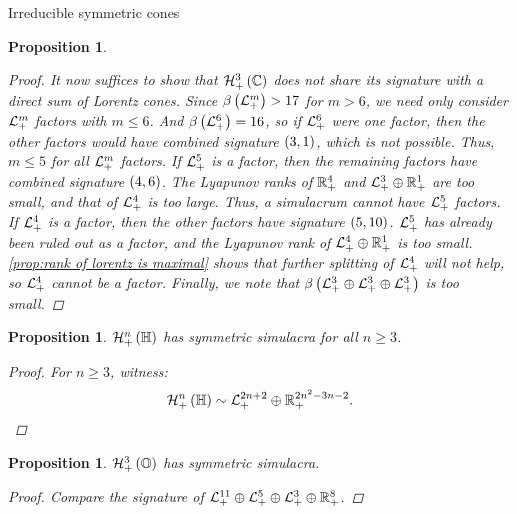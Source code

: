 \documentclass{interact}
\theoremstyle{plain}
\newtheorem{proposition}[theorem]{Proposition}
\theoremstyle{definition}
\theoremstyle{remark}
\newcommand*{\Roneplus}[0]{ \mathbb{R}^{1}_{+} }
\begin{document}
\begin{section}{Irreducible symmetric cones}
\begin{proposition}
\begin{proof}
        It now suffices to show that $\Hnplus[3]\of{\Cn[1]}$ does not
        share its signature with a direct sum of Lorentz cones. Since
        $\lyapunovrank{\Lnplus[m]} > 17$ for $m > 6$, we need only
        consider $\Lnplus[m]$ factors with $m \le 6$. And
        $\lyapunovrank{\Lnplus[6]} = 16$, so if $\Lnplus[6]$ were one
        factor, then the other factors would have combined signature
        $\pair{3}{1}$, which is not possible. Thus, $m \le 5$ for all
        $\Lnplus[m]$ factors. If $\Lnplus[5]$ is a factor, then the
        remaining factors have combined signature $\pair{4}{6}$. The
        Lyapunov ranks of $\Rnplus[4]$ and $\Lnplus[3] \oplus
        \Roneplus$ are too small, and that of $\Lnplus[4]$ is too
        large. Thus, a simulacrum cannot have $\Lnplus[5]$ factors.
        If $\Lnplus[4]$ is a factor, then the other factors have
        signature $\pair{5}{10}$. $\Lnplus[5]$ has already been ruled
        out as a factor, and the Lyapunov rank of $\Lnplus[4] \oplus
        \Roneplus$ is too small\@. \cref{prop:rank of lorentz is
          maximal} shows that further splitting of $\Lnplus[4]$ will
        not help, so $\Lnplus[4]$ cannot be a factor. Finally, we note
        that $\lyapunovrank{\Lnplus[3] \oplus \Lnplus[3] \oplus
          \Lnplus[3]}$ is too small.
      \end{proof}
    \end{proposition}


    \begin{proposition}\label{prop:quaternion psd simulacra}
      $\Hnplus\of{\quaternions}$ has symmetric simulacra for all $n \ge 3$.

      \begin{proof}
        For $n \ge 3$, witness:
        \begin{equation*}
          \Hnplus[n]\of{\quaternions}
          \sim
          \Lnplus[2n+2]
          \oplus
          \Rnplus[2n^{2} - 3n - 2].
          \qedhere
        \end{equation*}
      \end{proof}
    \end{proposition}


    \begin{proposition}\label{prop:octonion psd simulacra}
      $\Hnplus[3]\of{\octonions}$ has symmetric simulacra.

      \begin{proof}
        Compare the signature of $\Lnplus[11] \oplus \Lnplus[5] \oplus
        \Lnplus[3] \oplus \Rnplus[8]$.
      \end{proof}
    \end{proposition}


\end{section}
\end{document}
